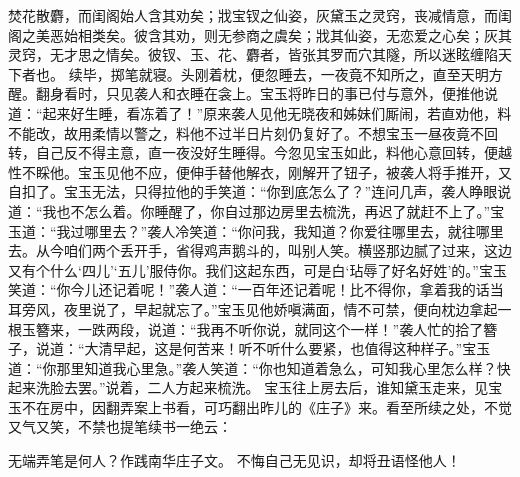 \documentclass[12pt,oneside]{book}
\begin{document}
焚花散麝，而闺阁始人含其劝矣；戕宝钗之仙姿，灰黛玉之灵窍，丧减情意，而闺阁之美恶始相类矣。彼含其劝，则无参商之虞矣；戕其仙姿，无恋爱之心矣；灰其灵窍，无才思之情矣。彼钗、玉、花、麝者，皆张其罗而穴其隧，所以迷眩缠陷天下者也。
续毕，掷笔就寝。头刚着枕，便忽睡去，一夜竟不知所之，直至天明方醒。翻身看时，只见袭人和衣睡在衾上。宝玉将昨日的事已付与意外，便推他说道：“起来好生睡，看冻着了！”原来袭人见他无晓夜和姊妹们厮闹，若直劝他，料不能改，故用柔情以警之，料他不过半日片刻仍复好了。不想宝玉一昼夜竟不回转，自己反不得主意，直一夜没好生睡得。今忽见宝玉如此，料他心意回转，便越性不睬他。宝玉见他不应，便伸手替他解衣，刚解开了钮子，被袭人将手推开，又自扣了。宝玉无法，只得拉他的手笑道：“你到底怎么了？”连问几声，袭人睁眼说道：“我也不怎么着。你睡醒了，你自过那边房里去梳洗，再迟了就赶不上了。”宝玉道：“我过哪里去？”袭人冷笑道：“你问我，我知道？你爱往哪里去，就往哪里去。从今咱们两个丢开手，省得鸡声鹅斗的，叫别人笑。横竖那边腻了过来，这边又有个什么‘四儿’‘五儿’服侍你。我们这起东西，可是白‘玷辱了好名好姓’的。”宝玉笑道：“你今儿还记着呢！”袭人道：“一百年还记着呢！比不得你，拿着我的话当耳旁风，夜里说了，早起就忘了。”宝玉见他娇嗔满面，情不可禁，便向枕边拿起一根玉簪来，一跌两段，说道：“我再不听你说，就同这个一样！”袭人忙的拾了簪子，说道：“大清早起，这是何苦来！听不听什么要紧，也值得这种样子。”宝玉道：“你那里知道我心里急。”袭人笑道：“你也知道着急么，可知我心里怎么样？快起来洗脸去罢。”说着，二人方起来梳洗。
宝玉往上房去后，谁知黛玉走来，见宝玉不在房中，因翻弄案上书看，可巧翻出昨儿的《庄子》来。看至所续之处，不觉又气又笑，不禁也提笔续书一绝云：

无端弄笔是何人？作践南华庄子文。
不悔自己无见识，却将丑语怪他人！
\end{document}
